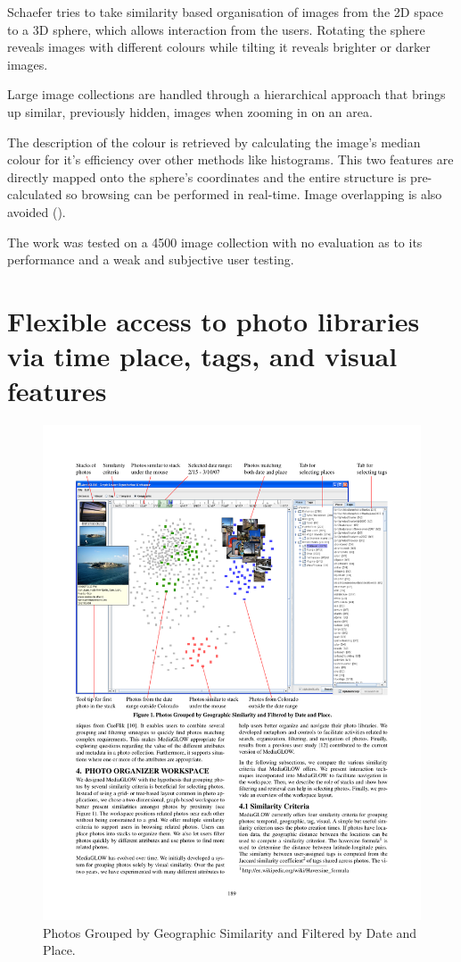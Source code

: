 Schaefer \cite{Schaefer:2010p1871} tries to take similarity based organisation of images from the 2D space to a 3D sphere, which allows interaction from the users. Rotating the sphere reveals images with different colours while tilting it reveals brighter or darker images.

Large image collections are handled through a hierarchical approach that brings up similar, previously hidden, images when zooming in on an area.

The description of the colour is retrieved by calculating the image's median colour for it's efficiency over other methods like histograms. This two features are directly mapped onto the sphere's coordinates and the entire structure is pre-calculated so browsing can be performed in real-time. Image overlapping is also avoided ().

The work was tested on a 4500 image collection with no evaluation as to its performance and a weak and subjective user testing.


\newpage
\section{Flexible access to photo libraries via time place, tags, and visual features} %
\label{sub:Girgensohn}
\begin{figure}[ht]
	\centering
		\includegraphics[width=\textwidth]{imgs/Girgensohn1.pdf}
	\caption{Photos Grouped by Geographic Similarity and Filtered by Date and Place.}
	\label{fig:girgensohn}
\end{figure}

